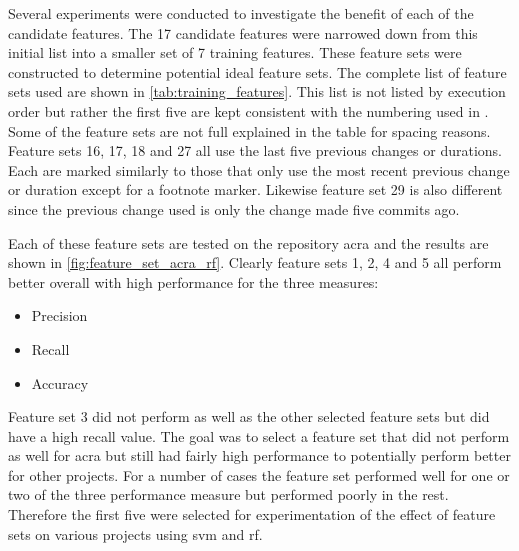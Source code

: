 Several experiments were conducted to investigate the benefit of each of the candidate features. The 17 candidate features were narrowed down from this initial list into a smaller set of 7 training features. These feature sets were constructed to determine potential ideal feature sets. The complete list of feature sets used are shown in \autoref{tab:training_features}. This list is not listed by execution order but rather the first five are kept consistent with the numbering used in . Some of the feature sets are not full explained in the table for spacing reasons. Feature sets 16, 17, 18 and 27 all use the last five previous changes or durations. Each are marked similarly to those that only use the most recent previous change or duration except for a footnote marker. Likewise feature set 29 is also different since the previous change used is only the change made five commits ago.

Each of these feature sets are tested on the repository acra and the results are shown in \autoref{fig:feature_set_acra_rf}. Clearly feature sets 1, 2, 4 and 5 all perform better overall with high performance for the three measures:
\begin{itemize}
\item Precision
\item Recall
\item Accuracy
\end{itemize}
Feature set 3 did not perform as well as the other selected feature sets but did have a high recall value. The goal was to select a feature set that did not perform as well for acra but still had fairly high performance to potentially perform better for other projects. For a number of cases the feature set performed well for one or two of the three performance measure but performed poorly in the rest. Therefore the first five were selected for experimentation of the effect of feature sets on various projects using \gls{svm} and \gls{rf}.


\renewcommand*{\thefootnote}{\fnsymbol{footnote}}

